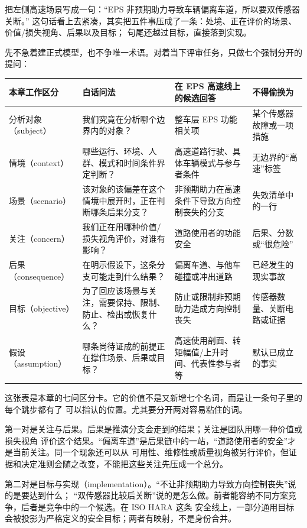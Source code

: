 把左侧高速场景写成一句：“EPS 非预期助力导致车辆偏离车道，所以要双传感器关断。”
这句话看上去紧凑，其实把五件事压成了一条：处境、正在评价的场景、价值/损失视角、后果以及目标；
句尾还越过目标，直接落到实现。

先不急着建正式模型，也不争唯一术语。对着当下评审任务，只做七个强制分开的提问：

\begin{center}
\begingroup\small
\setlength{\tabcolsep}{4pt}
\begin{tabularx}{\linewidth}{@{}XXXX@{}}
\toprule
本章工作区分 & 白话问法 & 在 EPS 高速线上的候选回答 & 不得偷换为 \\
\midrule
分析对象（subject） & 我们究竟在分析哪个边界内的对象？ & 整车层 EPS 功能相关项 & 某个传感器故障或一项措施 \\
情境（context） & 哪些运行、环境、人群、模式和时间条件界定判断？ & 高速道路行驶、具体车辆模式与参与者条件 & 无边界的“高速”标签 \\
场景（scenario） & 该对象的该偏差在这个情境中展开时，正在判断哪条后果分支？ & 非预期助力在高速条件下导致方向控制丧失的分支 & 失效清单中的一行 \\
关注（concern） & 我们正在用哪种价值/损失视角评价，对谁有影响？ & 道路使用者的功能安全 & 后果、分数或“很危险” \\
后果（consequence） & 在明示假设下，这条分支可能走到什么结果？ & 偏离车道、与他车碰撞或冲出道路 & 已经发生的现实事故 \\
目标（objective） & 为了回应该场景与关注，需要保持、限制、防止、检出或恢复什么？ & 防止或限制非预期助力造成方向控制丧失 & 传感器数量、关断电路或证据 \\
假设（assumption） & 哪条尚待证成的前提正在撑住场景、后果或目标？ & 高速使用剖面、转矩幅值/上升时间、代表性参与者等 & 默认已成立的事实 \\
\bottomrule
\end{tabularx}
\endgroup
\end{center}

这张表是本章的七问区分卡。它的价值不是又新增七个名词，而是让一条句子里的每个跳步都有了
可以指认的位置。尤其要分开两对容易粘住的词。

第一对是关注与后果。后果是推演分支会走到的结果；关注是团队用哪一种价值或损失视角
评价这个结果。“偏离车道”是后果链中的一站，“道路使用者的安全”才是当前关注。同一个现象还可以从
可用性、维修性或质量视角被另行评价，但证据和决定准则会随之改变，不能把这些关注先压成一个总分。

第二对是目标与实现（implementation）。“不让非预期助力导致方向控制丧失”说的是要达到什么；
“双传感器比较后关断”说的是怎么做。前者能容纳不同方案竞争，后者是竞争中的一个候选。在 ISO HARA 这条
安全线上，一部分通用目标会被投影为严格定义的安全目标；两者有映射，不是身份合并。

